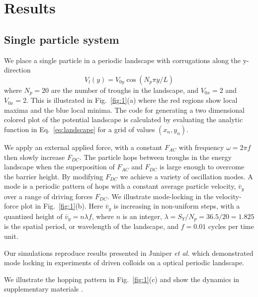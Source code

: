 \documentclass[prb,preprint]{revtex4}
\begin{document}
\section{Results}
\label{sec:results}

\subsection{Single particle system}
\label{sec:one}

We place a single particle in a periodic landscape with
corrugations along the y-direction 
\begin{equation}
  \label{eq:landscape}
  V_l(y) = V_{0y} \cos{(N_p \pi y / L)} 
\end{equation}
where $N_p=20$ are the number of troughs in the landscape,
and $V_{0x}=2$ and $V_{0x}=2$.
This is illustrated in Fig.~\ref{fig:1}(a) where
the red regions show local maxima and the blue local minima.
The code for generating
a two dimensional colored plot
of the potential landscape
is calculated by evaluating
the analytic function in Eq.~\ref{eq:landscape}
for a grid of values $(x_n,y_n)$.


We apply an external applied force, 
with 
a constant $F_{AC}$ with frequency $\omega = 2\pi f$
then slowly increase $F_{DC}$.
The particle hops between troughs in the energy landscape
when the superposition of $F_{AC}$ and $F_{DC}$ is large enough
to overcome the barrier height.
By modifying $F_{DC}$ we 
achieve a variety of oscillation modes.
A mode is a periodic pattern of hops
with a constant average particle velocity, $\bar{v}_{y}$
over a range of driving forces $F_{DC}$.
We illustrate mode-locking in 
the velocity-force plot in Fig.~\ref{fig:1}(b).
Here $\bar{v}_{y}$ is increasing in non-uniform steps,
with a quantized height of
$\bar{v}_{y} = n \lambda f$,
where $n$ is an integer,
$\lambda = S_Y/N_p = 36.5/20 = 1.825$ is the spatial period, or wavelength
of the landscape,
and $f = 0.01$ cycles per time unit.

Our simulations reproduce results presented in 
Juniper {\it et al.} \cite{juniper2015}
which demonstrated
mode locking in
experiments of 
driven colloids on a
optical periodic landscape.

We illustrate the hopping pattern in Fig.~\ref{fig:1}(c)
and 
show the dynamics 
in supplementary materials \cite{supp1}.
\end{document}
